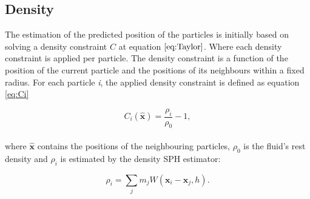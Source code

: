\subsection{Density}

The estimation of the predicted position of the particles is initially based on solving a density constraint $C$ at equation $\ref{eq:Taylor}$. Where each density constraint is applied per particle. The density constraint is a function of the position of the current particle and the positions of its neighbours within a fixed radius. For each particle \textit{i}, the applied density constraint is defined as equation \ref{eq:Ci}

\begin{equation}
\label{eq:Ci}
C_i(\hat{\mathbf{x}}) = \frac{\rho_i}{\rho_0} - 1,
\end{equation}
\\
where $\hat{\mathbf{x}}$ contains the positions of the neighbouring particles, $\rho_0$ is the fluid's rest density and $\rho_i$ is estimated by the density SPH estimator:

\begin{equation}
\label{eq:Rhoi}
\rho_i = \sum\limits_{j} m_j W(\mathbf{x}_i - \mathbf{x}_j, h).
\end{equation}

